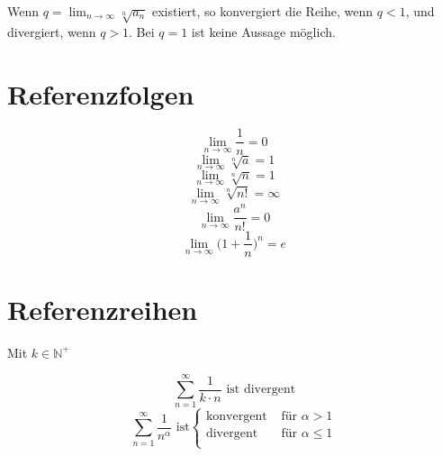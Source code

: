 \documentclass[10pt,twocolumn]{article}
\newcommand{\ra}{\rightarrow}
\begin{document}
Wenn $q = \lim_{n\rightarrow\infty} \sqrt[n]{a_n}$ existiert,
so konvergiert die Reihe, wenn $q < 1$, und divergiert, wenn
$q > 1$. Bei $q = 1$ ist keine Aussage möglich.

\section{Referenzfolgen}

\[
    \lim_{n\ra\infty} \frac{1}{n} = 0
\] \[
    \lim_{n\ra\infty} \sqrt[n]{a} = 1
\] \[
    \lim_{n\ra\infty} \sqrt[n]{n} = 1
\] \[
    \lim_{n\ra\infty} \sqrt[n]{n!} = \infty
\] \[
    \lim_{n\ra\infty} \frac{a^n}{n!} = 0
\] \[
    \lim_{n\ra\infty} \Big(1 + \frac{1}{n}\Big)^n = e
\]

\section{Referenzreihen}

Mit $k \in \mathbb{N}^+$

\[
    \sum_{n=1}^\infty \frac{1}{k \cdot n} \text{ ist divergent}
\] \[
    \sum_{n=1}^\infty \frac{1}{n^\alpha} \text{ ist}
    \begin{cases}
        \text{konvergent} & \text{ für } \alpha > 1 \\
        \text{divergent} & \text{ für } \alpha \leq 1 \\
    \end{cases}
\]
\end{document}
